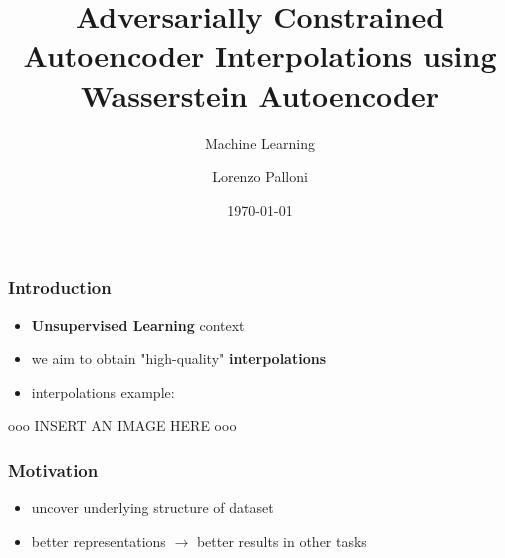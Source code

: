 \documentclass{beamer}
\title[ML - 2019/20 - Lorenzo Palloni]{Adversarially Constrained Autoencoder Interpolations using Wasserstein Autoencoder}
\subtitle{Machine Learning}
\author{Lorenzo Palloni}
\institute[]{
    University of Florence\\
    \medskip
    \textit{lorenzo.palloni@stud.unifi.it }
}
\date{\today}
\begin{document}
\begin{frame}
\titlepage %
\end{frame}

\begin{frame}
\frametitle{Introduction}
  \begin{itemize}
    \item \textbf{Unsupervised Learning} context
    \item we aim to obtain "high-quality" \textbf{interpolations}
    \item interpolations example:
\end{itemize}
    ooo INSERT AN IMAGE HERE ooo
\end{frame}
\begin{frame}
\frametitle{Motivation}
  \begin{itemize}
    \item uncover underlying structure of dataset
    \item better representations $\rightarrow$ better results in other tasks
  \end{itemize}
\end{frame}
\begin{frame}
\frametitle{}
\end{frame}
\end{document}
